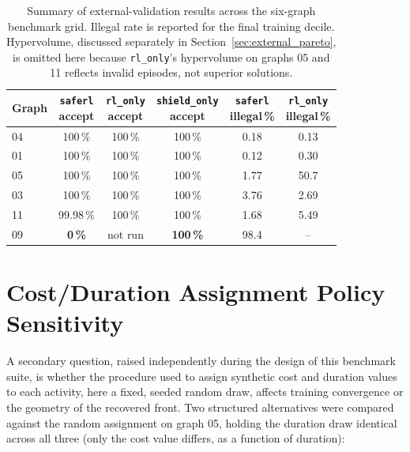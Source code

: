 \begin{table}[H]
\centering
\caption{Summary of external-validation results across the six-graph
benchmark grid. Illegal rate is reported for the final training decile.
Hypervolume, discussed separately in Section~\ref{sec:external_pareto},
is omitted here because \texttt{rl\_only}'s hypervolume on graphs 05
and 11 reflects invalid episodes, not superior solutions.}
\label{tab:external_master}
{\renewcommand{\arraystretch}{1.5}
\setlength{\tabcolsep}{6pt}
\begin{tabular}{lccccc}
\toprule
\textbf{Graph} & \shortstack{\textbf{\texttt{saferl}}\\\textbf{accept}} & \shortstack{\textbf{\texttt{rl\_only}}\\\textbf{accept}}
& \shortstack{\textbf{\texttt{shield\_only}}\\\textbf{accept}} & \shortstack{\textbf{\texttt{saferl}}\\\textbf{illegal\,\%}}
& \shortstack{\textbf{\texttt{rl\_only}}\\\textbf{illegal\,\%}} \\
\midrule
04 & 100\,\%   & 100\,\% & 100\,\% & 0.18 & 0.13 \\
01 & 100\,\%   & 100\,\% & 100\,\% & 0.12 & 0.30 \\
05 & 100\,\%   & 100\,\% & 100\,\% & 1.77 & 50.7 \\
03 & 100\,\%   & 100\,\% & 100\,\% & 3.76 & 2.69 \\
11 & 99.98\,\% & 100\,\% & 100\,\% & 1.68 & 5.49 \\
09 & \textbf{0\,\%} & not run & \textbf{100\,\%} & 98.4 & -- \\
\bottomrule
\end{tabular}}
\end{table}

\section{Cost/Duration Assignment Policy Sensitivity}
\label{sec:external_policy}

A secondary question, raised independently during the design of this
benchmark suite, is whether the procedure used to assign synthetic
cost and duration values to each activity, here a fixed, seeded
random draw, affects training convergence or the geometry of the
recovered front. Two structured alternatives were compared against the
random assignment on graph 05, holding the duration draw identical
across all three (only the cost value differs, as a function of
duration):

